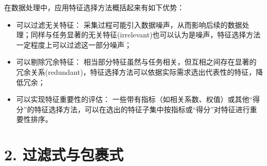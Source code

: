 \documentclass[a4paper,UTF8]{article}
\begin{document}
  在数据处理中，应用特征选择方法概括起来有如下优势：
  \begin{itemize}
    \item 可以过滤无关特征：
    采集过程可能引入数据噪声，从而影响后续的数据处理；同样与任务显著的无关特征(irrelevant)也可以认为是噪声，特征选择方法一定程度上可以过滤这一部分噪声；

    \item 可以剔除冗余特征：
    相当部分特征虽然与任务相关，但互相之间存在显著的冗余关系(redundant)，特征选择方法可以依据实际需求选出代表性的特征，降低冗余；

    \item 可以实现特征重要性的评估：
    一些带有指标（如相关系数、权值）或其他“得分”的特征选择方法，可以在选出的特征子集中按指标或“得分”对特征进行重要性排序。

  \end{itemize}







\section*{2. 过滤式与包裹式}
\end{document}
